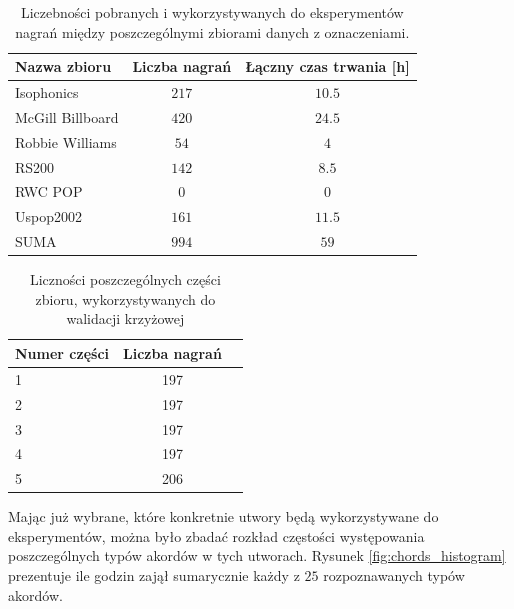 \begin{table}
    \centering
    \caption{Liczebności pobranych i wykorzystywanych do eksperymentów nagrań między poszczególnymi zbiorami danych z oznaczeniami.}
    \label{tab:datasets2}
    \begin{tabular}{|l|c|c|}
        \hline
        Nazwa zbioru & Liczba nagrań & Łączny czas trwania [h] \\
        \hline
        Isophonics          & $217$ & $10.5$ \\ %
        McGill Billboard    & $420$ & $24.5$ \\ %
        Robbie Williams     & $54$  & $4$    \\ %
        RS200               & $142$ & $8.5$  \\ %
        RWC POP             & $0$   & $0$    \\
        Uspop2002           & $161$ & $11.5$ \\ %
        \hline
        SUMA                & $994$ & $59$   \\
        \hline
    \end{tabular}
\end{table}

\begin{table}
    \centering
    \caption{Liczności poszczególnych części zbioru, wykorzystywanych do walidacji krzyżowej}
    \label{tab:datasets3}
    \begin{tabular}{|l|c|c|}
        \hline
        Numer części & Liczba nagrań \\
        \hline
        1  & 197 \\
        2  & 197 \\
        3  & 197 \\
        4  & 197 \\
        5  & 206 \\
        \hline
    \end{tabular}
\end{table}

Mając już wybrane, które konkretnie utwory będą wykorzystywane do eksperymentów, można było zbadać
rozkład częstości występowania poszczególnych typów akordów w tych utworach. Rysunek
\ref{fig:chords_histogram} prezentuje ile godzin zajął sumarycznie każdy z $25$ rozpoznawanych typów
akordów.

